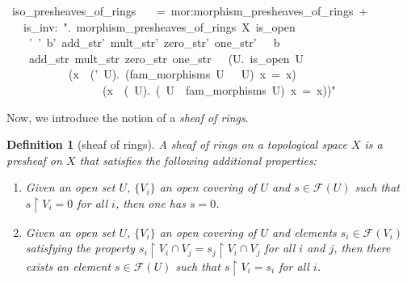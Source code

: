 \documentclass[12pt]{scrartcl}
\newtheorem{definition}[proposition]{Definition}
\begin{document}
\begin{isabelle}
\ iso\_presheaves\_of\_rings\ \isanewline
\ \ =\ mor:morphism\_presheaves\_of\_rings\ +\ \isanewline
\ \ \ is\_inv:\ "\isasymexists \isasympsi .\ morphism\_presheaves\_of\_rings\ X\ is\_open\ \isanewline
\ \ \ \ \isasymFF '\ \isasymrho '\ b'\ add\_str'\ mult\_str'\ zero\_str'\ one\_str'\ \isasymFF \ \isasymrho \ b\ \isanewline
\ \ \ \ add\_str\ mult\_str\ zero\_str\ one\_str\ \isasympsi \ \isasymand \ (\isasymforall U.\ is\_open\ U\ \isanewline
\ \ \ \ \ \ \ \ \ \ \isasymlongrightarrow \ (\isasymforall x\ \isasymin \ (\isasymFF '\ U).\ (fam\_morphisms\ U\ \isasymcirc \ \isasympsi \ U)\ x\ =\ x)\ \isanewline
\ \ \ \ \ \ \ \ \ \ \ \ \ \ \ \ \isasymand \ (\isasymforall x\ \isasymin \ (\isasymFF \ U).\ (\isasympsi \ U\ \isasymcirc \ fam\_morphisms\ U)\ x\ =\ x))"
\end{isabelle}

Now, we introduce the notion of a \emph{sheaf of rings}. 			

\begin{definition}[sheaf of rings]
	A sheaf of rings on a topological space $X$ is a presheaf on $X$ that satisfies the following additional properties:
	\begin{enumerate}
		\item[(locality)] Given an open set $U$, $\lbrace V_i \rbrace$ an open covering of $U$ and $s \in \mathscr{F}(U)$ such that $s \restriction V_i = 0$ for all $i$, then one has $s = 0$.
		\item[(glueing)] Given an open set $U$, $\lbrace V_i \rbrace$ an open covering of $U$ and elements $s_i \in \mathscr{F}(V_i)$ satisfying the property $s_i \restriction V_i \cap V_j = s_j \restriction V_i \cap V_j$ for all $i$ and $j$, then there exists an element $s \in \mathscr{F}(U)$ such that $s \restriction V_i = s_i$ for all $i$.  
	\end{enumerate}	
\end{definition}
\end{document}
